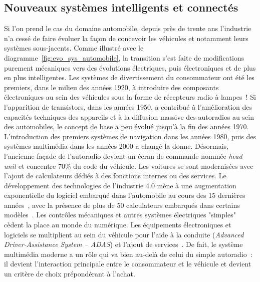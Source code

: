\documentclass[french, a4paper, 11pt, twoside, pdftex]{StyleThese}
\begin{document}
	\subsection{Nouveaux systèmes intelligents et connectés}
		Si l'on prend le cas du domaine automobile, depuis près de trente ans l'industrie n'a cessé de faire évoluer la façon de concevoir les véhicules et notamment leurs systèmes sous-jacents. Comme illustré avec le  diagramme~\ref{fig:evo_sys_automobile}, la transition s'est faite de modifications purement mécaniques vers des évolutions électriques, puis électroniques et de plus en plus intelligentes. Les systèmes de divertissement du consommateur ont été les premiers, dans le milieu des années 1920, à introduire des composants électroniques au sein des véhicules sous la forme de récepteurs radio à lampes~! Si l’apparition de transistors, dans les années 1950, a contribué à	l’amélioration des capacités techniques des appareils et à la diffusion massive des autoradios au sein des automobiles, le concept de base a peu évolué jusqu'à la fin des années 1970. L’introduction des premiers systèmes de navigation dans les années 1980, puis des systèmes multimédia dans les années 2000 a changé la donne. Désormais, l'ancienne façade de l’autoradio devient un écran de commande nommée \emph{head unit} et concentre 70\% du code du véhicule.	Les voitures se sont modernisées avec l'ajout de calculateurs dédiés à des fonctions internes ou des services. Le développement des technologies de l'industrie {4.0} mène à une augmentation exponentielle du logiciel embarqué dans l'automobile au cours des 15 dernières années~\cite{blanchet_industrie_2016}, avec la présence de plus de 50 calculateurs embarqués dans certains modèles~\cite{juliussen_navigating_2022}. Les contrôles mécaniques et autres systèmes électriques "simples" cèdent la place au monde du numérique. Les équipements électroniques et logiciels se multiplient au sein du véhicule pour l’aide à la conduite (\textit{Advanced Driver-Assistance System -- ADAS}) et l’ajout de services~\cite{schmidt_automotive_2010}. De fait, le système multimédia moderne a un rôle qui va bien au-delà de celui du simple autoradio~: il devient l'interaction principale entre le consommateur et le véhicule et devient un critère de choix prépondérant à l'achat.
\end{document}

